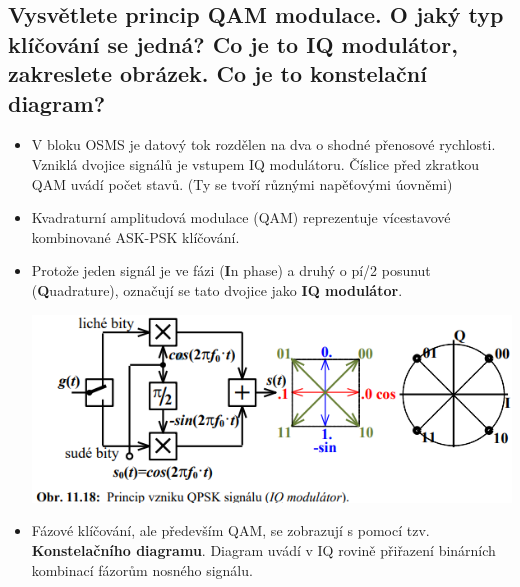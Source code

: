 \subsection{Vysvětlete princip QAM modulace. O jaký typ klíčování se jedná? Co je to IQ modulátor, zakreslete obrázek. Co je to konstelační diagram? }
\begin{itemize}
    \item V bloku OSMS je datový tok rozdělen na dva o shodné přenosové rychlosti.  Vzniklá dvojice signálů je vstupem IQ modulátoru. Číslice před zkratkou QAM uvádí počet stavů. (Ty se tvoří různými napěťovými úovněmi)
    \item Kvadraturní amplitudová modulace (QAM) reprezentuje vícestavové kombinované ASK-PSK klíčování.
    \item Protože jeden signál je ve fázi (\textbf{I}n phase) a druhý o pí/2 posunut (\textbf{Q}uadrature), označují se tato dvojice jako \textbf{IQ modulátor}.
    
    \includegraphics[]{images/image1.png}
    
    \item Fázové klíčování, ale především QAM, se zobrazují s pomocí tzv. \textbf{Konstelačního diagramu}. Diagram uvádí v IQ rovině přiřazení binárních kombinací fázorům nosného signálu.
\end{itemize}


